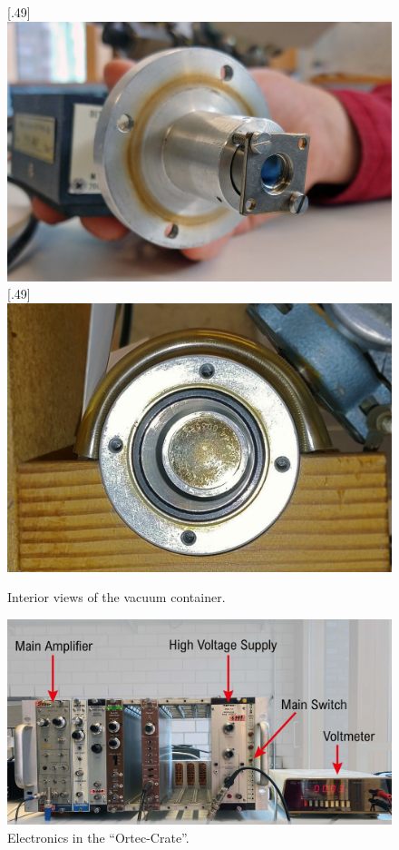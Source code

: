 \begin{figure}
	\centering
	[.49\linewidth]
	{\includegraphics[width=\linewidth]{img/detektor_foto}}
	[.49\linewidth]
	{\includegraphics[width=\linewidth]{img/quelle_foto}}
	\caption{Interior views of the vacuum container.}
\end{figure}
\begin{figure}
	\centering
	\includegraphics[width=0.75\linewidth]{img/setup_3.jpg}
	\caption{Electronics in the \enquote{Ortec-Crate}.}
	\label{fig:setup3}
\end{figure}

